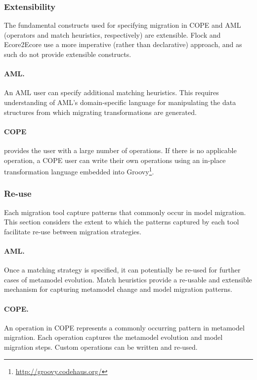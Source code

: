 \subsubsection{Extensibility}
The fundamental constructs used for specifying migration in COPE and AML (operators and match heuristics, respectively) are extensible. Flock and Ecore2E\-core use a more imperative (rather than declarative) approach, and as such do not provide extensible constructs.

\paragraph{AML.} An AML user can specify additional matching heuristics. This requires understanding of AML's domain-specific language for manipulating the data structures from which migrating transformations are generated.

\paragraph{COPE} provides the user with a large number of operations. If there is no applicable operation, a COPE user can write their own operations using an in-place transformation language embedded into Groovy\footnote{\url{http://groovy.codehaus.org/}}.


\subsubsection{Re-use}
Each migration tool capture patterns that commonly occur in model migration. This section considers the extent to which the patterns captured by each tool facilitate re-use between migration strategies.

\paragraph{AML.} Once a matching strategy is specified, it can potentially be re-used for further cases of metamodel evolution. Match heuristics provide a re-usable and extensible mechanism for capturing metamodel change and model migration patterns.

\paragraph{COPE.} An operation in COPE represents a commonly occurring pattern in metamodel migration. Each operation captures the metamodel evolution and model migration steps. Custom operations can be written and re-used.

